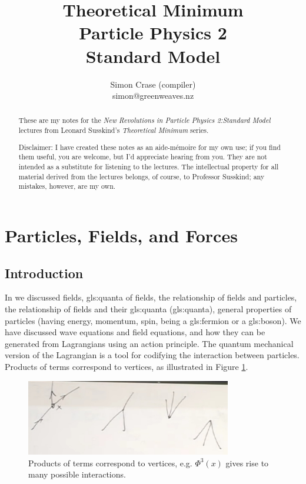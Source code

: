 \documentclass[]{article}
\title{Theoretical Minimum\\Particle Physics 2\\Standard Model}
\author{Simon Crase (compiler)\\simon@greenweaves.nz}
\begin{document}
\maketitle

\begin{abstract}
	These are my notes for the \emph{New Revolutions in Particle Physics 2:Standard Model} lectures from Leonard Susskind's \emph{Theoretical Minimum} series\cite{susskind2007theoretical}.
	
	Disclaimer: I have created these notes as an aide-m\'emoire for my own use; if you find them useful, you are welcome, but I'd appreciate hearing from you. They are not intended as a substitute for listening to the lectures. The intellectual property for all material derived from the lectures belongs, of course, to Professor Susskind; any mistakes, however, are my own.
\end{abstract}

\tableofcontents
\listoffigures
\listoftables
\listoftheorems

\section{Particles, Fields, and Forces}

\subsection{Introduction}

In  \cite[Particle Physics 1: Basic Concepts]{susskind2007theoretical} we discussed fields, \gls{gls:quanta} of  fields, the relationship of fields and particles, the relationship of fields and their \gls{gls:quanta} (\glsdesc{gls:quanta}), general properties of particles (having energy, momentum, spin, being a \gls{gls:fermion} or a \gls{gls:boson}). We have discussed wave equations and field equations, and how they can be generated from Lagrangians using an action principle. The quantum mechanical version of  the Lagrangian is a tool for codifying the interaction between particles. Products of terms correspond to vertices, as illustrated in Figure \ref{fig:phi:3:x}.
\begin{figure}[H]
	\caption[Products of terms correspond to vertices]{Products of terms correspond to vertices, e.g. $\Phi^3(x)$ gives rise to many possible interactions.}\label{fig:phi:3:x}
	\includegraphics[width=0.8\textwidth]{phi-3-x}
\end{figure}
\end{document}
